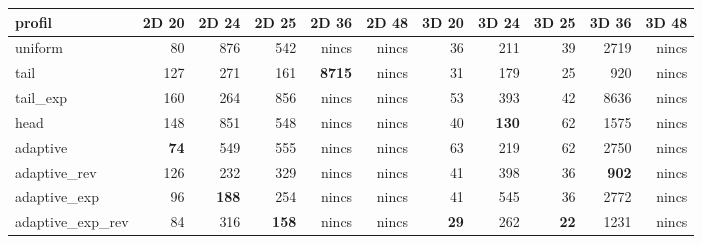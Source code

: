 \begin{tabular}{lrrrrrrrrrr}
\hline
profil & 2D 20 & 2D 24 & 2D 25 & 2D 36 & 2D 48 & 3D 20 & 3D 24 & 3D 25 & 3D 36 & 3D 48 \\
\hline
uniform & 80 & 876 & 542 & nincs & nincs & 36 & 211 & 39 & 2719 & nincs \\
tail & 127 & 271 & 161 & \textbf{8715} & nincs & 31 & 179 & 25 & 920 & nincs \\
tail\_exp & 160 & 264 & 856 & nincs & nincs & 53 & 393 & 42 & 8636 & nincs \\
head & 148 & 851 & 548 & nincs & nincs & 40 & \textbf{130} & 62 & 1575 & nincs \\
adaptive & \textbf{74} & 549 & 555 & nincs & nincs & 63 & 219 & 62 & 2750 & nincs \\
adaptive\_rev & 126 & 232 & 329 & nincs & nincs & 41 & 398 & 36 & \textbf{902} & nincs \\
adaptive\_exp & 96 & \textbf{188} & 254 & nincs & nincs & 41 & 545 & 36 & 2772 & nincs \\
adaptive\_exp\_rev & 84 & 316 & \textbf{158} & nincs & nincs & \textbf{29} & 262 & \textbf{22} & 1231 & nincs \\
\hline
\end{tabular}

